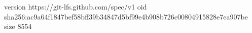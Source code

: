 version https://git-lfs.github.com/spec/v1
oid sha256:ac9a64f1847bef58bff39b34847d5bf99e4b908b726c00804915828e7ea907be
size 8554
